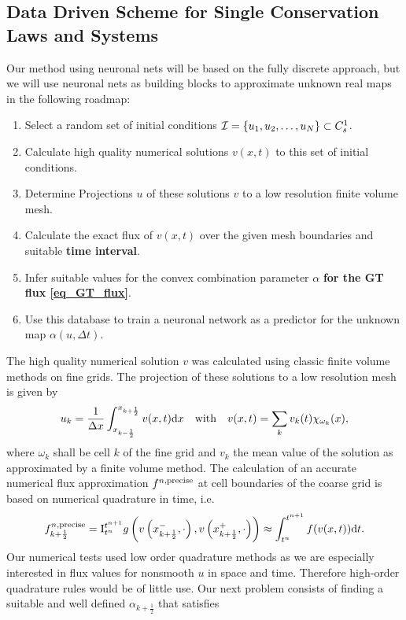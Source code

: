  
\subsection{Data Driven Scheme for Single Conservation Laws and Systems}
 Our method using neuronal nets will be based on the fully discrete approach, but we will use neuronal nets as building blocks to approximate unknown real maps in the following roadmap:
\begin{enumerate}
	\item Select a random set of initial conditions $\mathcal{I} = \{u_1, u_2 , \dots, u_N \} \subset C^1_s$.
	\item Calculate high quality numerical solutions $v(x, t)$ to this set of initial conditions.
	\item Determine Projections $u$ of these solutions $v$ to a low resolution finite volume mesh.
	\item Calculate the exact flux of $v(x, t)$ over the given mesh boundaries and suitable \textbf{ time interval}.
	\item Infer suitable values for the convex combination parameter $\alpha$ \textbf{for the GT flux \eqref{eq_GT_flux}}. %
	\item Use this database to train a neuronal network as a predictor for the unknown map $\alpha(u, \Delta t)$.
\end{enumerate}
The high quality numerical solution $v$ was calculated using classic finite volume methods on fine grids. The projection of these solutions to a low resolution mesh is given by
\[
	u_k = \frac{1}{\Delta x}\int_{x_{k-\frac 1 2}}^{x_{k+\frac 1 2}} v(x, t) \mathrm{d} x \quad \text{with} \quad v(x, t) = \sum_k v_k(t)\chi_{\omega_k}(x),
\] 
where $\omega_k$ shall be cell $k$ of the fine grid and $v_k$ the mean value of the solution as approximated by a finite volume method. The calculation of an accurate numerical flux  approximation $f^{n,\mathrm{precise}}$ at cell boundaries of the coarse grid is based on numerical quadrature in time, i.e.
\[
	f^{n,\mathrm{precise}}_{k+\frac 1 2} = \mathrm{I}_{t^n}^{t^{n+1}} g\left (v\left(x^-_{k+\frac 1 2}, \cdot\right), v\left(x^+_{k+\frac 1 2}, \cdot \right) \right) \approx  \int_{t^n}^{t^{n+1}} f(v(x, t))  \mathrm{d} t.
\]
Our numerical tests used low order quadrature methods as we are especially interested in flux values for nonsmooth $u$ in space and time. Therefore high-order quadrature rules would be of little use. Our next problem consists of finding a suitable and well defined $\alpha_{k+\frac 1 2}$ that satisfies
